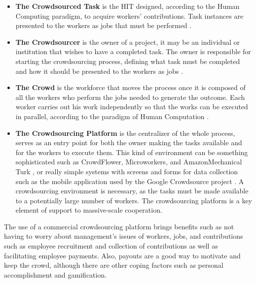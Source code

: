 \begin{itemize}

\item{\textbf{The Crowdsourced Task}} is the HIT designed, according to the Human Computing paradigm, to acquire workers' contributions. Task instances are presented to the workers as jobs that must be performed \cite{Difallah:2015:DMC:2736277.2741685}.

\item{\textbf{The Crowdsourcer}} is the owner of a project, it may be an individual or institution that wishes to have a completed task. The owner is responsible for starting the crowdsourcing process, defining what task must be completed and how it should be presented to the workers as jobs \cite{6861072}.

\item{\textbf{The Crowd}} is the workforce that moves the process once it is composed of all the workers who perform the jobs needed to generate the outcome. Each worker carries out his work independently so that the works can be executed in parallel, according to the paradigm of Human Computation \cite{Rohwer:2010:NHC:1837885.1837897}.

\item{\textbf{The Crowdsourcing Platform}} is the centralizer of the whole process, serves as an entry point for both the owner making the tasks available and for the workers to execute them. This kind of environment can be something sophisticated such as CrowdFlower, Microworkers, and AmazonMechanical Turk \cite{Difallah:2015:DMC:2736277.2741685}, or really simple systems with screens and forms for data collection such as the mobile application used by the Google Crowdsource project \cite{google_cs}. A crowdsourcing environment is necessary, as the tasks must be made available to a potentially large number of workers. The crowdsourcing platform is a key element of support to massive-scale cooperation.

\end{itemize}

The use of a commercial crowdsourcing platform brings benefits such as not having to worry about management's issues of workers, jobs, and contributions such as employee recruitment and collection of contributions as well as facilitating employee payments. Also, payouts are a good way to motivate and keep the crowd, although there are other coping factors such as personal accomplishment and gamification.



